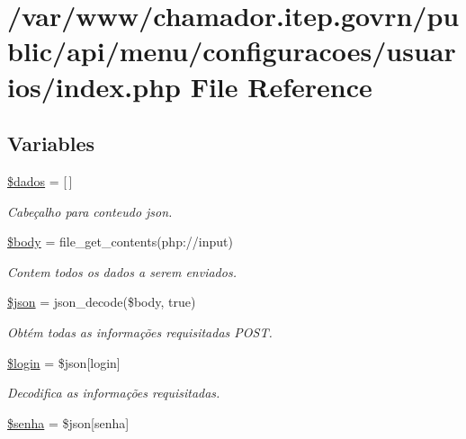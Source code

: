 \hypertarget{menu_2configuracoes_2usuarios_2index_8php}{}\section{/var/www/chamador.itep.\+govrn/public/api/menu/configuracoes/usuarios/index.php File Reference}
\label{menu_2configuracoes_2usuarios_2index_8php}
\subsection*{Variables}
\begin{DoxyCompactItemize}
\item 
\hyperlink{menu_2configuracoes_2usuarios_2index_8php_a252370d95039a38fa11afab784725d58}{\$dados} = \mbox{[}$\,$\mbox{]}
\begin{DoxyCompactList}\small\item\em Cabeçalho para conteudo json. \end{DoxyCompactList}\item 
\hyperlink{menu_2configuracoes_2usuarios_2index_8php_a26b9f9373f7bb79dfcf8a86dff086b45}{\$body} = file\+\_\+get\+\_\+contents(\textquotesingle{}php\+://input\textquotesingle{})
\begin{DoxyCompactList}\small\item\em Contem todos os dados a serem enviados. \end{DoxyCompactList}\item 
\hyperlink{menu_2configuracoes_2usuarios_2index_8php_acedd13b51401130848ce18f4d5c52605}{\$json} = json\+\_\+decode(\$body, true)
\begin{DoxyCompactList}\small\item\em Obtém todas as informações requisitadas P\+O\+ST. \end{DoxyCompactList}\item 
\hyperlink{menu_2configuracoes_2usuarios_2index_8php_afc31993e855f9631572adfedcfe6f34b}{\$login} = \$json\mbox{[}\textquotesingle{}login\textquotesingle{}\mbox{]}
\begin{DoxyCompactList}\small\item\em Decodifica as informações requisitadas. \end{DoxyCompactList}\item 
\hyperlink{menu_2configuracoes_2usuarios_2index_8php_a3678c8769c9698fd30581c1016c5f475}{\$senha} = \$json\mbox{[}\textquotesingle{}senha\textquotesingle{}\mbox{]}

\end{DoxyCompactItemize}
